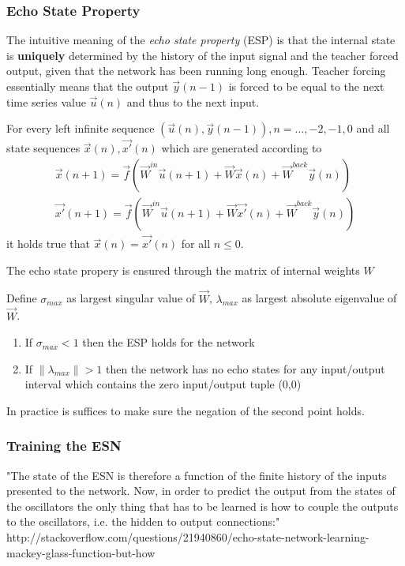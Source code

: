 \subsubsection{Echo State Property}
The intuitive meaning of the \emph{echo state property} (ESP) is that the internal state is \textbf{uniquely} determined by the history of the input signal and the teacher forced output, given that the network has been running long enough. Teacher forcing essentially means that the output $\vec{y}(n-1)$ is forced to be equal to the next time series value $\vec{u}(n)$ and thus to the next input.
\begin{frm-def}
For every left infinite sequence $(\vec{u}(n),\vec{y}(n-1)),n=\dots,-2,-1,0$ and all state sequences $\vec{x}(n),\vec{x'}(n)$ which are generated according to
\begin{align*}	
	\vec{x}(n+1)=\vec{f}(\vec{W}^{in}\vec{u}(n+1)+\vec{W}\vec{x}(n)+\vec{W}^{back}\vec{y}(n))\\
	\vec{x'}(n+1)=\vec{f}(\vec{W}^{in}\vec{u}(n+1)+\vec{W}\vec{x'}(n)+\vec{W}^{back}\vec{y}(n))
\end{align*}
it holds true that $\vec{x}(n)=\vec{x'}(n)$ for all $n \leq 0$.
\end{frm-def}
The echo state propery is ensured through the matrix of internal weights $W$

\begin{frm-thm}
Define $\sigma_{max}$ as largest singular value of $\vec{W}$, $\lambda_{max}$ as largest absolute eigenvalue of $\vec{W}$.
\begin{enumerate}
\item If $\sigma_{max} < 1$ then the ESP holds for the network
\item If $\|\lambda_{max}\| > 1$ then the network has no echo states for any input/output interval which contains the zero input/output tuple (0,0)
\end{enumerate}
\end{frm-thm}
In practice is suffices to make sure the negation of the second point holds. 

\subsubsection*{Training the ESN}
"The state of the ESN is therefore a function of the finite history of the inputs presented to the network. Now, in order to predict the output from the states of the oscillators the only thing that has to be learned is how to couple the outputs to the oscillators, i.e. the hidden to output connections:"
http://stackoverflow.com/questions/21940860/echo-state-network-learning-mackey-glass-function-but-how

